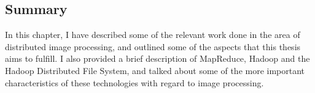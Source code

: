 \documentclass [12pt,a4paper]{report}
\begin{document}
\subsection{Summary}

In this chapter, I have described some of the relevant work done in the area of distributed image processing, and outlined some of the aspects that this thesis aims to fulfill. I also provided a brief description of MapReduce, Hadoop and the Hadoop Distributed File System, and talked about some of the more important characteristics of these technologies with regard to image processing.




\end{document}
